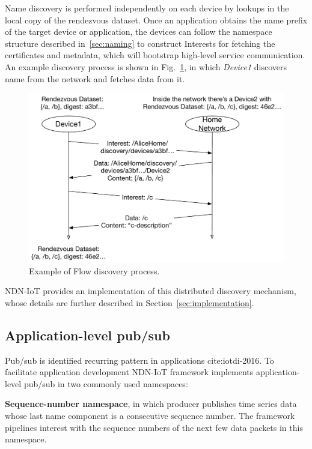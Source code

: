 Name discovery is performed independently on each device by lookups in the local copy of the rendezvous dataset.
Once an application obtains the name prefix of the target device or application, the devices can follow the namespace structure described in~\ref{sec:naming} to construct Interests for fetching the certificates and metadata, which will bootstrap high-level service communication. An example discovery process is shown in Fig.~\ref{fig:flow-discovery-process}, in which \textit{Device1} discovers name  from the network and fetches data from it.

\begin{figure}[!t]
\centering
\includegraphics[width=0.95\columnwidth]{flow-discovery-process.pdf}
\caption{Example of Flow discovery process.}
\label{fig:flow-discovery-process}
\end{figure}

NDN-IoT provides an implementation of this distributed discovery mechanism, whose details are further described in Section~\ref{sec:implementation}.

\subsection{Application-level pub/sub}

Pub/sub is identified recurring pattern in applications cite:iotdi-2016.
To facilitate application development NDN-IoT framework implements application-level pub/sub in two commonly used namespaces: 

\textbf{Sequence-number namespace}, in which producer publishes time series data whose last name component is a consecutive sequence number. The framework pipelines interest with the sequence numbers of the next few data packets in this namespace.


